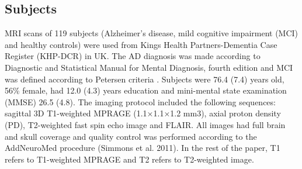 \subsection{Subjects}
MRI scans of 119 subjects (Alzheimer’s disease, mild cognitive impairment (MCI) and healthy controls) were used from Kings Health Partners-Dementia Case Register (KHP-DCR) in UK. The AD diagnosis was made according to Diagnostic and Statistical Manual for Mental Diagnosis, fourth edition and MCI was defined according to Petersen criteria \cite{10190820}. Subjects were 76.4 (7.4) years old, 56\% female, had 12.0 (4.3) years education and mini-mental state examination (MMSE) 26.5 (4.8). 
The imaging protocol included the following sequences: sagittal 3D T1-weighted MPRAGE (1.1×1.1×1.2 mm3), axial proton density (PD), T2-weighted fast spin echo image and FLAIR. All images had full brain and skull coverage and quality control was performed according to the AddNeuroMed procedure (Simmons et al. 2011). In the rest of the paper, T1 refers to T1-weighted MPRAGE and T2 refers to T2-weighted image.

    
    